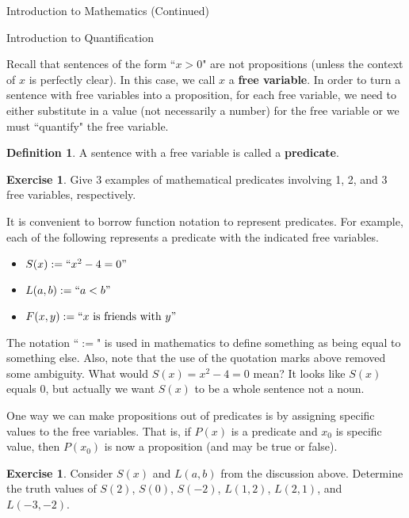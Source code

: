 \documentclass[11pt]{article}
\theoremstyle{definition}
\newtheorem{definition}[theorem]{Definition}
\newtheorem{exercise}[theorem]{Exercise}
\begin{document}
\addtocounter{section}{0}

\begin{section}{Introduction to Mathematics (Continued)}

\addtocounter{subsection}{3}
\addtocounter{theorem}{59}


\begin{subsection}{Introduction to Quantification}

Recall that sentences of the form ``$x>0$" are not propositions (unless the context of $x$ is perfectly clear).  In this case, we call $x$ a \textbf{free variable}.  In order to turn a sentence with free variables into a proposition, for each free variable, we need to either substitute in a value (not necessarily a number) for the free variable or we must ``quantify" the free variable.  

\begin{definition}
A sentence with a free variable is called a \textbf{predicate}.
\end{definition}

\begin{exercise}
Give 3 examples of mathematical predicates involving 1, 2, and 3 free variables, respectively.
\end{exercise}

It is convenient to borrow function notation to represent predicates.  For example, each of the following represents a predicate with the indicated free variables.
\begin{itemize}
\item $S(x):=``x^2-4=0"$
\item $L(a,b):=``a<b"$
\item $F(x,y):=``x \mbox{ is friends with } y"$
\end{itemize}

The notation ``$:=$" is used in mathematics to define something as being equal to something else.  Also, note that the use of the quotation marks above removed some ambiguity.  What would $S(x)=x^2-4=0$ mean?  It looks like $S(x)$ equals 0, but actually we want $S(x)$ to be a whole sentence not a noun. 

One way we can make propositions out of predicates is by assigning specific values to the free variables.  That is, if $P(x)$ is a predicate and $x_0$ is specific value, then $P(x_0)$ is now a proposition (and may be true or false).

\begin{exercise}
Consider $S(x)$ and $L(a,b)$ from the discussion above.  Determine the truth values of $S(2)$, $S(0)$, $S(-2)$, $L(1,2)$, $L(2,1)$, and $L(-3,-2)$.
\end{exercise}


\end{subsection}
\end{section}
\end{document}
